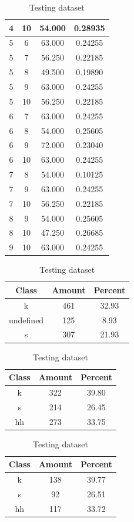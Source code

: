 \begin{table}
\begin{subtable}[h]{0.45\textwidth}
{\begin{tabular}{|c|c|c|c|}
 4 & 10 & 54.000 & 0.28935\\ \hline 
 5 & 6 & 63.000 & 0.24255\\ \hline 
 5 & 7 & 56.250 & 0.22185\\ \hline 
 5 & 8 & 49.500 & 0.19890\\ \hline 
 5 & 9 & 63.000 & 0.24255\\ \hline 
 5 & 10 & 56.250 & 0.22185\\ \hline 
 6 & 7 & 63.000 & 0.24255\\ \hline
 6 & 8 & 54.000 & 0.25605\\ \hline 
 6 & 9 & 72.000 & 0.23040\\ \hline 
 6 & 10 & 63.000 & 0.24255\\ \hline 
 7 & 8 & 54.000 & 0.10125\\ \hline 
 7 & 9 & 63.000 & 0.24255\\ \hline 
 7 & 10 & 56.250 & 0.22185\\ \hline 
 8 & 9 & 54.000 & 0.25605\\ \hline 
 8 & 10 & 47.250 & 0.26685\\ \hline 
 9 & 10 & 63.000 & 0.24255\\ \hline 

\end{tabular}
}\caption{xcsflux2010}\label{xlsflux2010}

\end{subtable}

\begin{subtable}[h]{0.45\textwidth}
\centering
\begin{tabular}{|c|c|c|}
\hline
Class & Amount & Percent\\ \hline
k & 461 & 32.93\\ \hline
undefined & 125 & 8.93\\ \hline
s & 307 & 21.93\\ \hline
\end{tabular}
\caption{Entire dataset after stripping short sounds}
\end{subtable}
\hfill
\begin{subtable}[h]{0.45\textwidth}
\centering
\begin{tabular}{|c|c|c|}
\hline
Class & Amount & Percent\\ \hline
k & 322 & 39.80\\ \hline
s & 214 & 26.45\\ \hline
hh & 273 & 33.75\\ \hline
\end{tabular}
\caption{Training dataset}
\end{subtable}
\hfill
\begin{subtable}[h]{0.45\textwidth}
\centering
\begin{tabular}{|c|c|c|}
\hline
Class & Amount & Percent\\ \hline
k & 138 & 39.77\\ \hline
s & 92 & 26.51\\ \hline
hh & 117 & 33.72\\ \hline
\end{tabular}
\caption{Testing dataset}
\end{subtable}
\hfill


\end{table}

